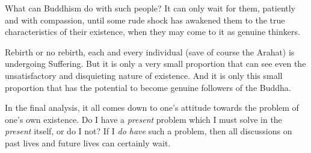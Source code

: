 What can Buddhism do with such people? It can only wait for them, patiently and with compassion, until some rude shock has awakened them to the true characteristics of their existence, when they may come to it as genuine thinkers.

Rebirth or no rebirth, each and every individual (save of course the Arahat) is undergoing Suffering. But it is only a very small proportion that can see even the unsatisfactory and disquieting nature of existence. And it is only this small proportion that has the potential to become genuine followers of the Buddha.

In the final analysis, it all comes down to one's attitude towards the problem of one's own existence. Do I have a \emph{present} problem which I must solve in the \emph{present} itself, or do I not? If I \emph{do have} such a problem, then all discussions on past lives and future lives can certainly wait.
